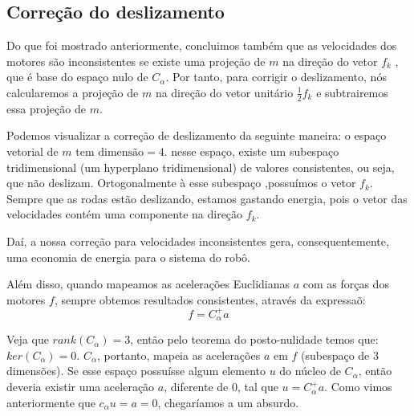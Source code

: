 \documentclass{article}
\begin{document}
\subsection{Correção do deslizamento}

\hspace{1cm} Do que foi mostrado anteriormente, concluimos também que as velocidades dos motores são inconsistentes se existe uma projeção de $m$ na direção do vetor $f_k$ , que é base do espaço nulo de $C_{\alpha}$. Por tanto, para corrigir o deslizamento, nós calcularemos a projeção de $m$ na direção do vetor unitário $\frac{1}{2}f_k$ e subtrairemos essa projeção de $m$.

Podemos visualizar a correção de deslizamento da seguinte maneira: o espaço vetorial de $m$ tem $\text{dimensão}= 4$. nesse espaço, existe um subespaço tridimensional (um hyperplano tridimensional) de valores consistentes, ou seja, que não deslizam. Ortogonalmente à esse subespaço ,possuímos o vetor $f_{k}$. Sempre que as rodas estão deslizando, estamos gastando energia, pois o vetor das velocidades contém uma componente na direção $f_{k}$.

Daí, a nossa correção para velocidades inconsistentes gera, consequentemente, uma economia de energia para o sistema do robô.

Além disso, quando mapeamos as acelerações Euclidianas $a$ com as forças dos motores $f$, sempre obtemos resultados consistentes, através da expressaõ:
\[f = C_{\alpha}^+a\]

Veja que $rank(C_{\alpha}) = 3$, então pelo teorema do posto-nulidade temos que: $ker(C_{\alpha}) = 0$. $C_{\alpha}$, portanto, mapeia as acelerações $a$  em $f$ (subespaço de 3 dimensões). Se esse espaço possuísse algum elemento $u$ do núcleo de $C_{\alpha}$, então deveria existir uma aceleração $a$, diferente de 0, tal que $u = C_{\alpha}^+a$. Como vimos anteriormente que $c_ {\alpha}u = a = 0$, chegaríamos a um absurdo.
\end{document}
